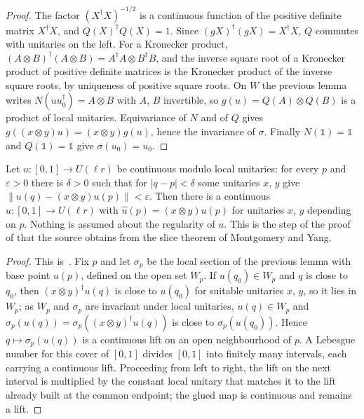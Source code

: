\begin{proof}\leanok
    The factor $(X^\dagger X)^{-1/2}$ is a continuous function of the positive
    definite matrix $X^\dagger X$, and $Q(X)^\dagger Q(X)=1$. Since
    $(gX)^\dagger(gX)=X^\dagger X$, $Q$ commutes with unitaries on the left. For
    a Kronecker product,
    $(A\otimes B)^\dagger(A\otimes B)=A^\dagger A\otimes B^\dagger B$, and the
    inverse square root of a Kronecker
    product of positive definite matrices is the Kronecker product of the inverse
    square roots, by uniqueness of positive square roots. On $W$ the previous
    lemma writes $N(uu_0^\dagger)=A\otimes B$ with $A$, $B$ invertible, so
    $g(u)=Q(A)\otimes Q(B)$ is a product of local unitaries. Equivariance of $N$
    and of $Q$ gives $g((x\otimes y)u)=(x\otimes y)g(u)$, hence the invariance
    of $\sigma$. Finally $N(\mathbb 1)=\mathbb 1$ and $Q(\mathbb 1)=\mathbb 1$
    give $\sigma(u_0)=u_0$.
\end{proof}

\begin{lemma}
    \label{lem:kronecker_path_lifting}
    \leanok
    Let $u:[0,1]\to U(\ell r)$ be continuous modulo local unitaries: for every
    $p$ and $\varepsilon>0$ there is $\delta>0$ such that for $|q-p|<\delta$
    some unitaries $x$, $y$ give $\|u(q)-(x\otimes y)u(p)\|<\varepsilon$. Then
    there is a continuous $\hat u:[0,1]\to U(\ell r)$ with
    $\hat u(p)=(x\otimes y)u(p)$ for unitaries $x$, $y$ depending on $p$.
    Nothing is assumed about the regularity of $u$. This is the step of the
    proof of \cite[Corollary~IV.7]{Cirac2017MPU} that the source obtains from
    the slice theorem of Montgomery and Yang.
\end{lemma}

\begin{proof}\leanok
    This is~\cite[``Lifting paths continuous modulo local
        unitaries'']{QICLean2026Blueprint}.
    Fix $p$ and let $\sigma_p$ be the local section of the previous lemma with
    base point $u(p)$, defined on the open set $W_p$. If $u(q_0)\in W_p$ and
    $q$ is close to $q_0$, then $(x\otimes y)^\dagger u(q)$ is close to $u(q_0)$
    for suitable unitaries $x$, $y$, so it lies in $W_p$; as $W_p$ and
    $\sigma_p$ are invariant under local unitaries, $u(q)\in W_p$ and
    $\sigma_p(u(q))=\sigma_p((x\otimes y)^\dagger u(q))$ is close to
    $\sigma_p(u(q_0))$. Hence $q\mapsto\sigma_p(u(q))$ is a continuous lift on an
    open neighbourhood of $p$. A Lebesgue number for this cover of $[0,1]$ divides
    $[0,1]$ into finitely many intervals, each carrying a continuous lift.
    Proceeding from left to right, the lift on the next interval is multiplied
    by the constant local unitary that matches it to the lift already built at
    the common endpoint; the glued map is continuous and remains a lift.
\end{proof}


